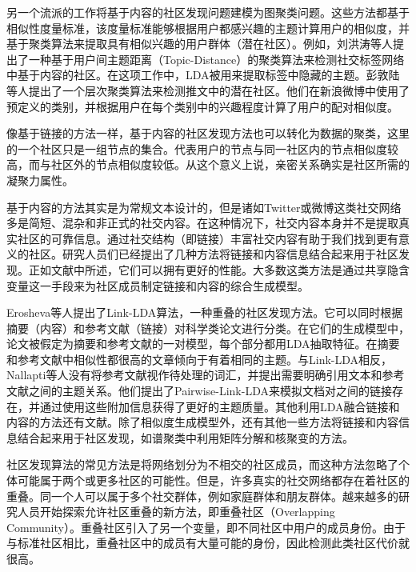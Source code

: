 另一个流派的工作将基于内容的社区发现问题建模为图聚类问题。这些方法都基于相似性度量标准，该度量标准能够根据用户都感兴趣的主题计算用户的相似度，并基于聚类算法来提取具有相似兴趣的用户群体（潜在社区）。例如，刘洪涛等人\cite{Liu2014Community}提出了一种基于用户间主题距离（Topic-Distance）的聚类算法来检测社交标签网络中基于内容的社区。在这项工作中，LDA被用来提取标签中隐藏的主题。彭敦陆等人\cite{Peng2015DICH}提出了一个层次聚类算法来检测推文中的潜在社区。他们在新浪微博中使用了预定义的类别，并根据用户在每个类别中的兴趣程度计算了用户的配对相似度。

像基于链接的方法一样，基于内容的社区发现方法也可以转化为数据的聚类，这里的一个社区只是一组节点的集合。代表用户的节点与同一社区内的节点相似度较高，而与社区外的节点相似度较低。从这个意义上说，亲密关系确实是社区所需的凝聚力属性。

基于内容的方法其实是为常规文本设计的，但是诸如Twitter或微博这类社交网络多是简短、混杂和非正式的社交内容。在这种情况下，社交内容本身并不是提取真实社区的可靠信息\cite{Yang2009Combining}。通过社交结构（即链接）丰富社交内容有助于我们找到更有意义的社区。研究人员们已经提出了几种方法将链接和内容信息结合起来用于社区发现。正如文献\cite{Cohn2001The,Getoor2003Learning}中所述，它们可以拥有更好的性能。大多数这类方法是通过共享隐含变量这一手段来为社区成员制定链接和内容的综合生成模型。

Erosheva等人\cite{Erosheva2004Mixed}提出了Link-LDA算法，一种重叠的社区发现方法。它可以同时根据摘要（内容）和参考文献（链接）对科学类论文进行分类。在它们的生成模型中，论文被假定为摘要和参考文献的一对模型，每个部分都用LDA抽取特征。在摘要和参考文献中相似性都很高的文章倾向于有着相同的主题。与Link-LDA相反，Nallapti等人\cite{Nallapati2008Joint}没有将参考文献视作待处理的词汇，并提出需要明确引用文本和参考文献之间的主题关系。他们提出了Pairwise-Link-LDA来模拟文档对之间的链接存在，并通过使用这些附加信息获得了更好的主题质量。其他利用LDA融合链接和内容的方法还有文献\cite{Dietz2007Unsupervised,Gruber2008Latent}。除了相似度生成模型外，还有其他一些方法将链接和内容信息结合起来用于社区发现，如谱聚类中利用矩阵分解和核聚变的方法\cite{Zhu2007Combining,Yu2008Clustering}。

社区发现算法的常见方法是将网络划分为不相交的社区成员，而这种方法忽略了个体可能属于两个或更多社区的可能性。但是，许多真实的社交网络都存在着社区的重叠\cite{Xie2013Overlapping}。同一个人可以属于多个社交群体，例如家庭群体和朋友群体。越来越多的研究人员开始探索允许社区重叠的新方法，即重叠社区（Overlapping Community）。重叠社区引入了另一个变量，即不同社区中用户的成员身份。由于与标准社区相比，重叠社区中的成员有大量可能的身份，因此检测此类社区代价就很高。

